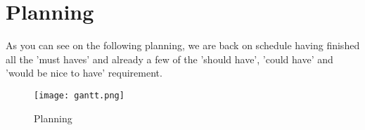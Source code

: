 \section{Planning}

As you can see on the following planning, we are back on schedule having finished all the 'must haves' and already a few of the 'should have', 'could have' and 'would be nice to have' requirement. \newline

\begin{figure}[!ht]
	\centering
	\texttt{[image: gantt.png]}
	\caption{Planning}
	\label{fig:length_eight_mouse}
\end{figure}
\FloatBarrier
